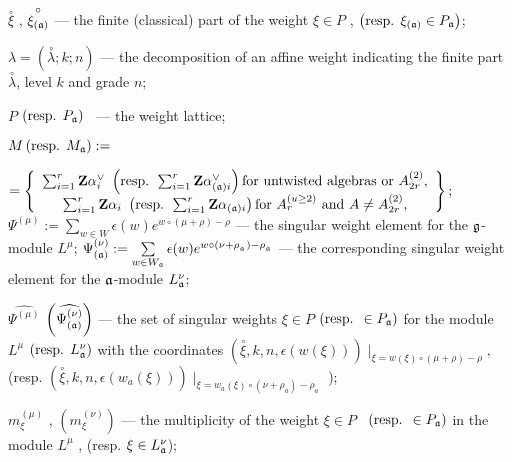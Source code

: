 \documentclass[a4paper,12pt]{article}
\theoremstyle{definition}
\theoremstyle{definition}
\theoremstyle{definition}
\newcommand{\co}[1]{\stackrel{\circ }{#1}}
\begin{document}
$\co{\xi }$ , $\co{\xi _{\left( \frak{a}\right) }}$
--- the finite (classical) part of the weight $\xi \in P$ , $\left( \mbox{%
resp. }\xi _{\left( \frak{a}\right) }\in P_{\frak{a}}\right) $;

$\lambda =\left( \co{\lambda };k;n\right) $ --- the
decomposition of an affine weight indicating the finite part $\co{\lambda }$, level $k$ and grade $n$;

$P$ $\left( \mbox{resp. } P_{\frak{a}}\right) $ \ --- the weight lattice;

$M \left( \mbox{resp. }M_{\frak{a}}\right) :=$

\noindent $=\left\{
\begin{array}{c}
\sum_{i=1}^{r}\mathbf{Z}\alpha _{i}^{\vee }\mbox{ }\left( \mbox{resp. }%
\sum_{i=1}^{r}\mathbf{Z}\alpha _{\left( \frak{a}\right) i}^{\vee }\right)
\mbox{for untwisted algebras or }A_{2r}^{\left( 2\right) }, \\
\sum_{i=1}^{r}\mathbf{Z}\alpha _{i}\mbox{ }\left( \mbox{resp. }\sum_{i=1}^{r}%
\mathbf{Z}\alpha _{\left( \frak{a}\right) i}\right) \mbox{for }A_{r}^{\left(
u\geq 2\right) }\mbox{ and }A\neq A_{2r}^{\left( 2\right) },
\end{array}
\right\} ;$\\
$\Psi ^{\left( \mu \right) }:=\sum\limits_{w\in W}\epsilon (w)e^{w\circ (\mu +\rho )-\rho }$ --- the singular weight element for the $\frak{g}$-module $L^{\mu }$;
$\Psi _{\left( \frak{a}\right) }^{\left( \nu \right) }:=\sum\limits_{w\in W_{\frak{a}}}\epsilon (w)e^{w\circ (\nu +\rho
_{_{\frak{a}}})-\rho _{_{\frak{a}}}}$ --- the corresponding singular weight
element for the $\frak{a}$-module $L_{\frak{a}}^{\nu }$;

$\widehat{\Psi ^{\left( \mu \right) }}$ $\left( \widehat{\Psi _{\left( \frak{%
a}\right) }^{\left( \nu \right) }}\right) $ --- the set of singular weights $%
\xi \in P$ $\left( \mbox{resp. }\in P_{\frak{a}}\right) $ for the module $%
L^{\mu }$ $\left( \mbox{resp. }L_{\frak{a}}^{\nu }\right) $ with the
coordinates $\left( \co{\xi },k,n,\epsilon \left( w\left( \xi
\right) \right) \right) \mid _{\xi =w\left( \xi \right) \circ (\mu +\rho
)-\rho },$ (resp. $\left( \co{\xi },k,n,\epsilon \left(
w_{a}\left( \xi \right) \right) \right) \mid _{\xi =w_{a}\left( \xi \right)
\circ (\nu +\rho _{a})-\rho _{a}}$ );

$m_{\xi }^{\left( \mu \right) }$ , $\left( m_{\xi }^{\left( \nu \right)
}\right) $ --- the multiplicity of the weight $\xi \in P$ \ $\left( \mbox{%
resp. }\in P_{\frak{a}}\right) $ in the module $L^{\mu }$ , (resp. $\xi \in
L_{\frak{a}}^{\nu } $);
\end{document}
